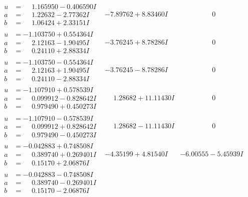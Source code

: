 \documentclass[1p]{elsarticle_modified}
\theoremstyle{definition}
\begin{document}
$$\begin{array}{c|c|c}
\begin{aligned}
u &= \phantom{-}1.165950 - 0.406590 I \\
a &= \phantom{-}1.22632 - 2.77362 I \\
b &= \phantom{-}1.06424 + 2.33151 I\end{aligned}
 & -7.89762 + 8.83460 I & \phantom{-0.000000 } 0 \\ \hline\begin{aligned}
u &= -1.103750 + 0.554364 I \\
a &= \phantom{-}2.12163 - 1.90495 I \\
b &= \phantom{-}0.24110 + 2.88334 I\end{aligned}
 & -3.76245 + 8.78286 I & \phantom{-0.000000 } 0 \\ \hline\begin{aligned}
u &= -1.103750 - 0.554364 I \\
a &= \phantom{-}2.12163 + 1.90495 I \\
b &= \phantom{-}0.24110 - 2.88334 I\end{aligned}
 & -3.76245 - 8.78286 I & \phantom{-0.000000 } 0 \\ \hline\begin{aligned}
u &= -1.107910 + 0.578539 I \\
a &= \phantom{-}0.099912 - 0.828642 I \\
b &= \phantom{-}0.979490 + 0.450273 I\end{aligned}
 & \phantom{-}1.28682 + 11.11430 I & \phantom{-0.000000 } 0 \\ \hline\begin{aligned}
u &= -1.107910 - 0.578539 I \\
a &= \phantom{-}0.099912 + 0.828642 I \\
b &= \phantom{-}0.979490 - 0.450273 I\end{aligned}
 & \phantom{-}1.28682 - 11.11430 I & \phantom{-0.000000 } 0 \\ \hline\begin{aligned}
u &= -0.042883 + 0.748508 I \\
a &= \phantom{-}0.389740 + 0.269401 I \\
b &= \phantom{-}0.15170 + 2.06876 I\end{aligned}
 & -4.35199 + 4.81540 I & -6.00555 - 5.45939 I \\ \hline\begin{aligned}
u &= -0.042883 - 0.748508 I \\
a &= \phantom{-}0.389740 - 0.269401 I \\
b &= \phantom{-}0.15170 - 2.06876 I\end{aligned}

\end{array}$$
\end{document}
